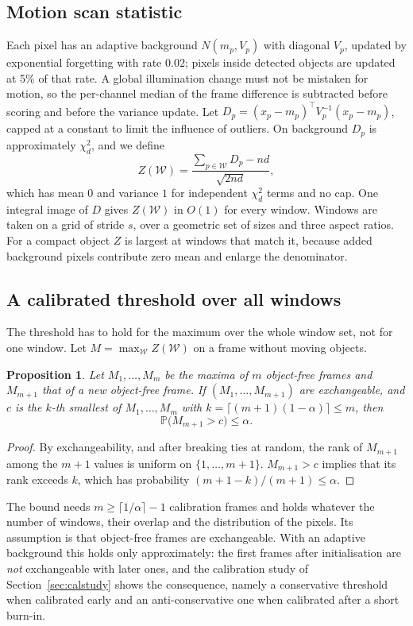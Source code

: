 \documentclass[11pt,a4paper]{article}
\newtheorem{proposition}{Proposition}
\theoremstyle{definition}
\newcommand{\Pp}{\mathbb{P}}
\begin{document}
\subsection{Motion scan statistic}\label{sec:scan}
Each pixel has an adaptive background $N(m_p,V_p)$ with diagonal $V_p$, updated by exponential forgetting with rate $0.02$; pixels inside detected objects are updated at 5\% of that rate.
A global illumination change must not be mistaken for motion, so the per-channel median of the frame difference is subtracted before scoring and before the variance update.
Let $D_p=(x_p-m_p)^{\top}V_p^{-1}(x_p-m_p)$, capped at a constant to limit the influence of outliers.
On background $D_p$ is approximately $\chi^2_d$, and we define
\begin{equation}\label{eq:Z}
Z(\mathcal W)=\frac{\sum_{p\in\mathcal W}D_p-nd}{\sqrt{2nd}},
\end{equation}
which has mean $0$ and variance $1$ for independent $\chi^2_d$ terms and no cap.
One integral image of $D$ gives $Z(\mathcal W)$ in $O(1)$ for every window.
Windows are taken on a grid of stride $s$, over a geometric set of sizes and three aspect ratios.
For a compact object $Z$ is largest at windows that match it, because added background pixels contribute zero mean and enlarge the denominator.

\subsection{A calibrated threshold over all windows}\label{sec:calibration}
The threshold has to hold for the maximum over the whole window set, not for one window.
Let $M=\max_{\mathcal W}Z(\mathcal W)$ on a frame without moving objects.

\begin{proposition}\label{prop:conformal}
Let $M_1,\dots,M_m$ be the maxima of $m$ object-free frames and $M_{m+1}$ that of a new object-free frame.
If $(M_1,\dots,M_{m+1})$ are exchangeable, and $c$ is the $k$-th smallest of $M_1,\dots,M_m$ with $k=\lceil(m+1)(1-\alpha)\rceil\le m$, then
\begin{equation}
\Pp\big(M_{m+1}>c\big)\le\alpha .
\end{equation}
\end{proposition}
\begin{proof}
By exchangeability, and after breaking ties at random, the rank of $M_{m+1}$ among the $m+1$ values is uniform on $\{1,\dots,m+1\}$.
$M_{m+1}>c$ implies that its rank exceeds $k$, which has probability $(m+1-k)/(m+1)\le\alpha$.
\end{proof}
The bound needs $m\ge\lceil 1/\alpha\rceil-1$ calibration frames and holds whatever the number of windows, their overlap and the distribution of the pixels.
Its assumption is that object-free frames are exchangeable.
With an adaptive background this holds only approximately: the first frames after initialisation are \emph{not} exchangeable with later ones, and the calibration study of Section~\ref{sec:calstudy} shows the consequence, namely a conservative threshold when calibrated early and an anti-conservative one when calibrated after a short burn-in.
\end{document}
